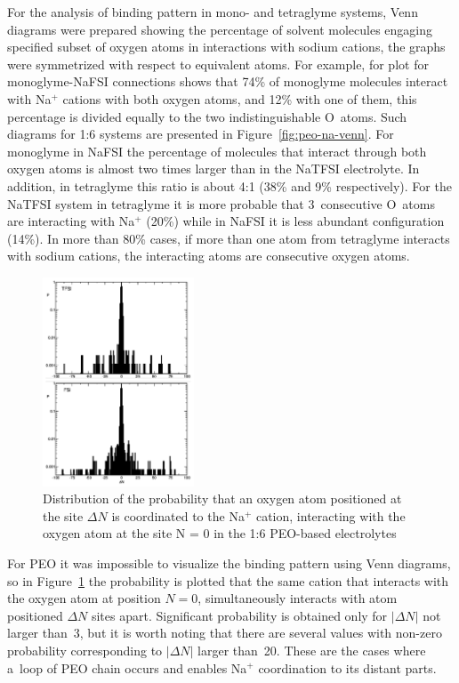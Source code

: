 For the analysis of binding pattern in mono- and tetraglyme systems, Venn diagrams were prepared showing the percentage of solvent molecules engaging specified subset of oxygen atoms in interactions with sodium cations, the graphs were symmetrized with respect to equivalent atoms. For example, for plot for monoglyme-NaFSI connections shows that 74\% of monoglyme molecules interact with Na$^{+}$ cations with both oxygen atoms, and 12\% with one of them, this percentage is divided equally to the two indistinguishable O~atoms. Such diagrams for 1:6 systems are presented in Figure~\ref{fig:peo-na-venn}. For monoglyme in NaFSI the percentage of molecules that interact through both oxygen atoms is almost two times larger than in the NaTFSI electrolyte. In addition, in tetraglyme this ratio is about 4:1 (38\% and 9\% respectively). For the NaTFSI system in tetraglyme it is more probable that 3~consecutive O~atoms are interacting with Na$^{+}$ (20\%) while in NaFSI it is less abundant configuration (14\%). In more than 80\% cases, if more than one atom from tetraglyme interacts with sodium cations, the interacting atoms are consecutive oxygen atoms.

\begin{figure}[H]
    \centering
    \includegraphics[width=0.4\textwidth]{img/3-structural-data-from-md-simulations/5-peo-na/peo-dn.png}
    \singlespacing
    \caption{Distribution of the probability that an oxygen atom positioned at the site $\Delta N$ is coordinated to the Na$^{+}$ cation, interacting with the oxygen atom at the site N = 0 in the 1:6 PEO-based electrolytes}
    \label{fig:peo-na-peo-dn}
\end{figure}

For PEO it was impossible to visualize the binding pattern using Venn diagrams, so in Figure~\ref{fig:peo-na-peo-dn} the probability is plotted that the same cation that interacts with the oxygen atom at position $N = 0$, simultaneously interacts with atom positioned $\Delta N$ sites apart. Significant probability is obtained only for $| \Delta N |$ not larger than~3, but it is worth noting that there are several values with non-zero probability corresponding to $| \Delta N |$ larger than~20. These are the cases where a~loop of PEO chain occurs and enables Na$^{+}$ coordination to its distant parts.

